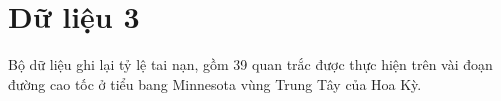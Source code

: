 \section{Dữ liệu 3}

Bộ dữ liệu ghi lại tỷ lệ tai nạn, gồm 39 quan trắc được thực hiện trên vài đoạn đường cao tốc ở tiểu bang Minnesota vùng Trung Tây của Hoa Kỳ.